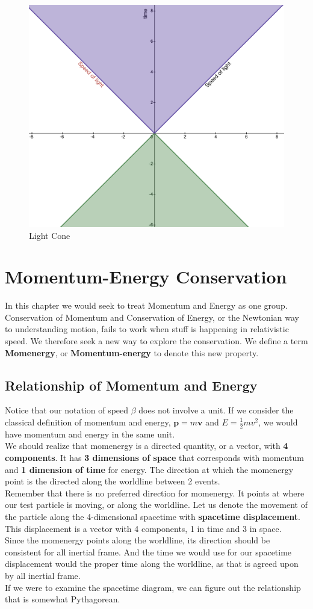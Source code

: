 \documentclass[12pt]{book}
\begin{document}
\begin{figure}[!h]
    \centering
    \includegraphics[width=0.5\linewidth]{picture/Light Cone.png}
    \caption{Light Cone}
    \label{fig:lightcone}
\end{figure}

\newpage

\section{Momentum-Energy Conservation}
In this chapter we would seek to treat Momentum and Energy as one group. Conservation of Momentum and Conservation of Energy, or the Newtonian way to understanding motion, fails to work when stuff is happening in relativistic speed. We therefore seek a new way to explore the conservation. We define a term \textbf{Momenergy}, or \textbf{Momentum-energy} to denote this new property.
\subsection{Relationship of Momentum and Energy}
Notice that our notation of speed $\beta$ does not involve a unit. If we consider the classical definition of momentum and energy, $\textbf{p}=m\textbf{v}$ and $E = \frac{1}{2}mv^2$, we would have momentum and energy in the same unit. \\
\newline
We should realize that momenergy is a directed quantity, or a vector, with \textbf{4 components}. It has \textbf{3 dimensions of space} that corresponds with momentum and \textbf{1 dimension of time} for energy. The direction at which the momenergy point is the directed along the worldline between 2 events.\\
\newline
Remember that there is no preferred direction for momenergy. It points at where our test particle is moving, or along the worldline. Let us denote the movement of the particle along the 4-dimensional spacetime with \textbf{spacetime displacement}. This displacement is a vector with 4 components, 1 in time and 3 in space. \\
\newline
Since the momenergy points along the worldline, its direction should be consistent for all inertial frame. And the time we would use for our spacetime displacement would the proper time along the worldline, as that is agreed upon by all inertial frame.\\
\newline
If we were to examine the spacetime diagram, we can figure out the relationship that is somewhat Pythagorean.\\
\end{document}
